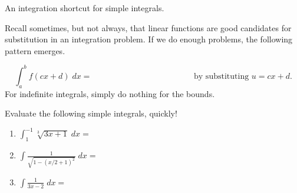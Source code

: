 \documentclass[../main.tex]{subfiles}
\begin{document}
  \clearpage
  An integration shortcut for simple integrals.

  Recall sometimes, but not always, that linear functions are good candidates for substitution in an integration problem. If we do enough problems, the following pattern emerges.
  \begin{mdframed}[style=simple]
    \begin{equation} \label{eq:integration-affine-substitution}
      \int_{a}^{b} f(cx+ d) \;dx = \hspace{2in} \text{ by substituting } u = cx + d.
    \end{equation}
  For indefinite integrals, simply do nothing for the bounds. 
  \end{mdframed}
  
  \begin{example}
    Evaluate the following simple integrals, quickly!

    \begin{enumerate}[wide]
      \item \(\int_{1}^{-1} \sqrt[3]{3x + 1} \;dx = \)
      \item \(\int \frac{1}{\sqrt{1 - (x/2 + 1)^2}} \;dx = \)
      \item \(\int \frac{1}{3x-2} \;dx = \)
    \end{enumerate}
  \end{example}
\end{document}
